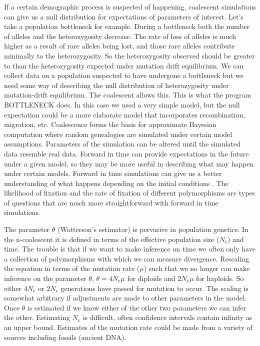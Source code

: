 \documentclass[11pt, oneside]{article}
\begin{document}
	If a certain demographic process is suspected of happening, coalescent simulations can give us a null distribution
for  expectations of parameters of interest. Let's take a population bottleneck for example. 
During a bottleneck both the number of alleles and the heterozygosity decrease. 
The rate of loss of alleles is much higher as a result of rare alleles being lost, and those rare alleles 
contribute minimally to the heterozygosity. So the heterozygosity observed should be greater to than the 
heterozygosity expected under mutation drift equilibrium. We can collect data on a population suspected to
have undergone a bottleneck but we need some way of describing the null distribution of heterozygosity under
mutation-drift equilibrium. The coalescent allows this. This is what the program BOTTLENECK \citep{Piry1999}
does. In this case we used a very simple model, but the null expectation could be a more elaborate model that incorporates 
recombination, migration, etc. Coalescence forms the basis for approximate Bayesian computation
where random genealogies are simulated under certain model assumptions. Parameters of the simulation
can be altered until the simulated data resemble real data. Forward in time can provide expectations in the future
under a given model, so they may be more useful in describing what may happen under certain models.
Forward in time simulations can give us a better understanding of what happens depending on the initial 
conditions  \citep{Rosenberg2002}. The likelihood of fixation and the rate of fixation of different polymorphisms
are types of questions that are much more straightforward with forward in time simulations.  

	The parameter $\theta$ (Watterson's estimator) is pervasive in population genetics. In the n-coalescent it is 
defined in terms of the effective population size ($N_e$) and time. The trouble is that if we want to make inference
on time we often only have a collection of polymorphisms with which we can measure divergence. Rescaling 
the equation in terms of the mutation rate ($\mu$) such that we no longer can make inference on the parameter
$\theta$, $\theta=4N_e\mu$ for diploids and $2N_e\mu$ for haploids. So either $4N_e$ or $2N_e$ generations
have passed for mutation to occur. The scaling is somewhat arbitrary if adjustments are 
made to other parameters in the model. Once $\theta$ is estimated if we know either 
of the other two parameters we can infer the other. Estimating
$N_e$ is difficult, often confidence intervals contain infinity as an upper bound. Estimates of the mutation 
rate could be made from a variety of sources including fossils (ancient DNA). 
\end{document}
